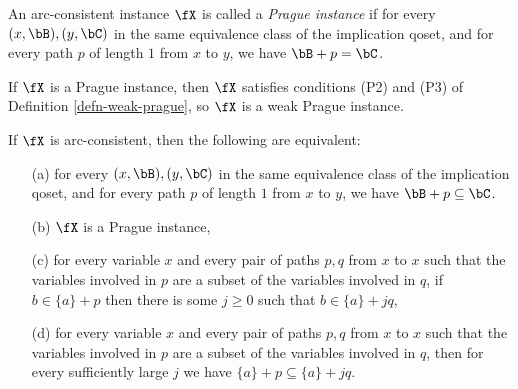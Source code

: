 \begin{defn} An arc-consistent instance $\fX$ is called a \emph{Prague instance} if for every $(x,\bB), (y,\bC)$ in the same equivalence class of the implication qoset, and for every path $p$ of length $1$ from $x$ to $y$, we have $\bB + p = \bC$.
\end{defn}

\begin{prop} If $\fX$ is a Prague instance, then $\fX$ satisfies conditions (P2) and (P3) of Definition \ref{defn-weak-prague}, so $\fX$ is a weak Prague instance.
\end{prop}

\begin{prop}\label{prop-prague} If $\fX$ is arc-consistent, then the following are equivalent:
\begin{itemize}
\item[(a)] for every $(x,\bB), (y,\bC)$ in the same equivalence class of the implication qoset, and for every path $p$ of length $1$ from $x$ to $y$, we have $\bB + p \subseteq \bC$.
\item[(b)] $\fX$ is a Prague instance,
\item[(c)] for every variable $x$ and every pair of paths $p,q$ from $x$ to $x$ such that the variables involved in $p$ are a subset of the variables involved in $q$, if $b \in \{a\} + p$ then there is some $j \ge 0$ such that $b \in \{a\} + jq$,
\item[(d)] for every variable $x$ and every pair of paths $p,q$ from $x$ to $x$ such that the variables involved in $p$ are a subset of the variables involved in $q$, then for every sufficiently large $j$ we have $\{a\} + p \subseteq \{a\} + jq$.
\end{itemize}
\end{prop}
